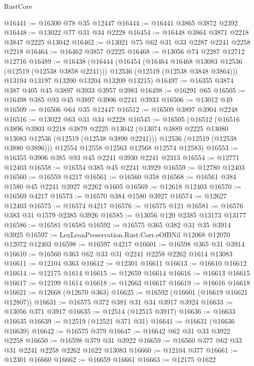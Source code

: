 \begin{lexlean}{RustCore}
\begin{coremodule}
@16441 := @16300 @78 @35 @12447
@16444 := @16441 @3865 @3872 @2392
@16448 := @13022 @77 @31 @34 @2228
@16454 := @16448 @3864 @3871 @2218 @3847 @2225 @13042
@16462 := @13021 @75 @62 @31 @33 @2287 @2241 @2258 @2218
@16464 := @16462 @3857 @2225
@16468 := @13056 @74 @2287 @12712 @12716
@16489 := @16438
    (@16444
      (@16454
        (@16464 @16468 @13083 @12536 (@12519 (@12538 @3858 @2241)))
        @12536
        (@12519 (@12538 @3848 @3864)))
      @13194
      @13197
      @13200
      @13204
      @13209
      @13215)
@16497 := @16355 @3874 @387 @405 @45 @3897 @3933 @3957 @3983
@16498 := @16291 @65
@16505 := @16498 @385 @93 @45 @3897 @3906 @2241 @3933
@16506 := @13012 @49
@16509 := @16506 @64 @35 @12447
@16512 := @16509 @3897 @3904 @2248
@16516 := @13022 @63 @31 @34 @2228
@16545 := @16505
    (@16512
      (@16516
        @3896
        @3903
        @2218
        @3879
        @2225
        @13042
        (@13074 @3889 @2225 @13080 @13083 @12536 (@12519 (@12538 @3890 @2241)))
        @12536
        (@12519 (@12538 @3880 @3896)))
      @12554
      @12558
      @12563
      @12568
      @12574
      @12583)
@16553 := @16355 @3906 @385 @93 @45 @2241 @3930 @2241 @2313
@16554 := @12771 @12403
@16558 := @16554 @385 @45 @2241 @3929
@16559 := @12780 @12403
@16560 := @16559 @4217
@16561 := @16560 @358
@16568 := @16561 @384 @1580 @45 @2241 @3927 @2262 @1605
@16569 := @12618 @12403
@16570 := @16569 @4217
@16573 := @16570 @384 @1580 @3927
@16574 := @12627 @12403
@16575 := @16574 @4217
@16576 := @16575 @121
@16581 := @16576 @383 @31 @1579 @2385 @3926
@16585 := @13056 @120 @2385 @13173 @13177
@16586 := @16581 @16585
@16592 := @16575 @365 @382 @31 @35 @3914 @3925
@16597 := LexLeanPreservation.Rust.Corr.eOfBNil @12068 @12070 @12072 @12403
@16598 := @16597 @4217
@16601 := @16598 @365 @31 @3914
@16610 := @16560 @363 @62 @33 @31 @2241 @2258 @2262 @1614 @13083
@16611 := @12104 @363
@16612 := @12301 @16611
@16613 := @16610 @16612
@16614 := @12175 @1614
@16615 := @12659 @16614
@16616 := @16613 @16615
@16617 := @12199 @1614
@16618 := @12663 @16617
@16619 := @16616 @16618
@16621 := @12668 (@12670 @363)
@16625 := @16592 (@16601 (@16619 @16621 @12807))
@16631 := @16575 @372 @381 @31 @34 @3917 @3924
@16633 := @13056 @371 @3917
@16635 := @12514 (@12515 @3917)
@16636 := @16633 @16635
@16639 := @12519 (@12521 @371 @31)
@16641 := @16631 (@16636 @16639)
@16642 := @16575 @379
@16647 := @16642 @62 @31 @33 @3922 @2258
@16650 := @16598 @379 @31 @3922
@16659 := @16560 @377 @62 @33 @31 @2241 @2258 @2262 @1622 @13083
@16660 := @12104 @377
@16661 := @12301 @16660
@16662 := @16659 @16661
@16663 := @12175 @1622

\end{coremodule}
\end{lexlean}
